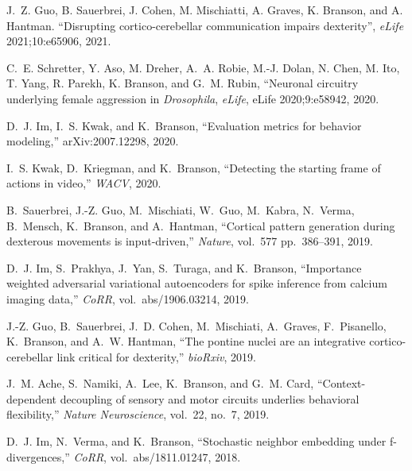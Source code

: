 \begin{cvenum}

\item J.~Z. Guo, B. Sauerbrei, J. Cohen, M. Mischiatti, A. Graves, K. Branson, and A. Hantman. ``Disrupting cortico-cerebellar communication impairs dexterity'', {\em eLife} 2021;10:e65906, 2021.
  
\item C.~E. Schretter, Y. Aso, M. Dreher, A.~A. Robie, M.-J. Dolan, N. Chen, M. Ito, T. Yang, R. Parekh, K. Branson, and G.~M. Rubin, ``Neuronal circuitry underlying female aggression in {\em {{D}}rosophila}, {\em eLife}, eLife 2020;9:e58942, 2020.
  
\item D.~J. Im, I.~S. Kwak, and K.~Branson, ``Evaluation metrics for behavior modeling,'' arXiv:2007.12298, 2020.
  
\item I.~S. Kwak, D.~Kriegman, and K.~Branson, ``Detecting the starting frame of actions in video,'' {\em WACV}, 2020.

\item B.~Sauerbrei, J.-Z. Guo, M.~Mischiati, W.~Guo, M.~Kabra, N.~Verma, B.~Mensch, K.~Branson, and A.~Hantman, ``Cortical pattern generation during dexterous movements is input-driven,'' {\em Nature}, vol.~577 pp.~386--391, 2019.

\item D.~J. Im, S.~Prakhya, J.~Yan, S.~Turaga, and K.~Branson, ``Importance weighted
  adversarial variational autoencoders for spike inference from calcium imaging
  data,'' {\em CoRR}, vol.~abs/1906.03214, 2019.

\item J.-Z. Guo, B.~Sauerbrei, J.~D. Cohen, M.~Mischiati, A.~Graves, F.~Pisanello,
  K.~Branson, and A.~W. Hantman, ``The pontine nuclei are an integrative
  cortico-cerebellar link critical for dexterity,'' {\em bioRxiv}, 2019.

\item J.~M. Ache, S.~Namiki, A.~Lee, K.~Branson, and G.~M. Card, ``Context-dependent
  decoupling of sensory and motor circuits underlies behavioral flexibility,''
  {\em Nature Neuroscience}, vol.~22, no.~7, 2019.

\item D.~J. Im, N.~Verma, and K.~Branson, ``Stochastic neighbor embedding under
  f-divergences,'' {\em CoRR}, vol.~abs/1811.01247, 2018.


\end{cvenum}
